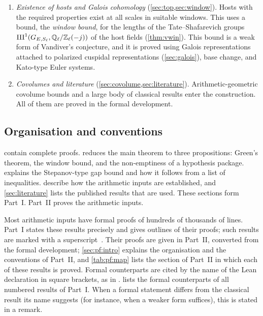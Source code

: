 \begin{enumerate}[label=(\arabic*)]
\begin{itemize}
  \item \emph{archimedean} inequalities: slopes and covolumes, computed through the Siegel--Weil
  formula, mass formulas and the Chowla--Selberg formula, bound the total divisibility, as in the
  slope inequalities of Bost \cite{Bost1996,Bost2001}.
  \end{itemize}
Approximate orthogonality of the relevant theta series (Theorem~S, \cref{thm:theorem-S}), Green's
parametrization of the cuspidal characters of finite general linear groups \cite{Green1955}, and a
Galois-cohomological link complete the inputs. Combining these inequalities by linear arithmetic
yields the required upper bound (\cref{prop:gap-bound,thm:global-chain}).
\item \emph{Existence of hosts and Galois cohomology} (\cref{sec:top,sec:window}). Hosts with the
required properties exist at all scales in suitable windows. This uses a bound, the \emph{window
bound}, for the lengths of the Tate--Shafarevich groups $\mathrm{III}^1(G_{E,S_\ell},\mathbb{Q}_\ell/\mathbb{Z}_\ell(-j))$ of the host
fields (\cref{thm:vwin}). This bound is a weak form of Vandiver's conjecture, and it is proved using
Galois representations attached to polarized cuspidal representations (\cref{sec:galois}), base
change, and Kato-type Euler systems.
\item \emph{Covolumes and literature} (\cref{sec:covolume,sec:literature}). Arithmetic-geometric
covolume bounds and a large body of classical results enter the construction. All of them are proved
in the formal development.
\end{enumerate}

\subsection{Organisation and conventions}\label{sec:intro:conv}

 contain complete proofs.  reduces the main
theorem to three propositions: Green's theorem, the window bound, and the non-emptiness of a
hypothesis package.  explains the Stepanov-type gap bound and how it follows from
a list of inequalities.  describe how the
arithmetic inputs are established, and \cref{sec:literature} lists the published results that are
used. These sections form Part~I. Part~II proves the arithmetic inputs.

Most arithmetic inputs have formal proofs of hundreds of thousands of lines. Part~I states these results
precisely and gives outlines of their proofs; such results are marked with a superscript~\Fmark{}. Their
proofs are given in Part~II, converted from the formal development; \cref{sec:pf:intro} explains the
organisation and the conventions of Part~II, and \cref{tab:pf:map} lists the section of Part~II in
which each of these results is proved. Formal counterparts are cited by the name of the Lean
declaration in square brackets, as in .
 lists the formal counterparts of all numbered results of Part~I. When a formal
statement differs from the classical result its name suggests (for instance, when a weaker form
suffices), this is stated in a remark.
